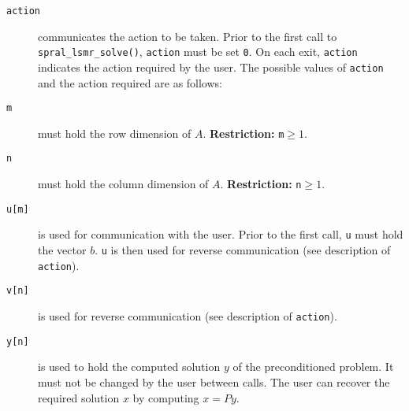 \noindent
\begin{description}

\item[\texttt{action}] communicates the action to be taken.
Prior to the first call to {\tt spral\_lsmr\_solve()},
{\tt action} must be set {\tt 0}. On each exit, {\tt action}
indicates the action required by the user. The possible values of {\tt action}
and the action required are as follows:

\item[\texttt{m}] must hold 
the row dimension of $A$. {\bf Restriction:} {\tt m}$ \ge 1$.

\item[\texttt{n}] must hold 
the column dimension of $A$.  {\bf Restriction:} {\tt n}$ \ge 1$.

\item[\texttt{u[m]}] is used for communication with the user. Prior to the first call, {\tt u} must hold the vector $b$.
{\tt u} is then used for reverse communication (see description of \texttt{action}).

\item[\texttt{v[n]}] is used for reverse communication (see description of \texttt{action}).


\item[\texttt{y[n]}] is used to hold the computed solution $y$ of the
preconditioned problem. It must not be changed by the user between calls.
The user can recover the required solution $x$ by computing $x = Py$.


\end{description}
